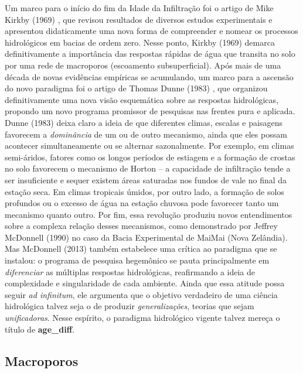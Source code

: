 \documentclass[./main.tex]{subfiles}
\begin{document}
\par Um marco para o início do fim da Idade da Infiltração foi o artigo de Mike Kirkby (1969) \cite{Kirkby1969}, que revisou resultados de diversos estudos experimentais e apresentou didaticamente uma nova forma de compreender e nomear os processos hidrológicos em bacias de ordem zero. Nesse ponto, Kirkby (1969) demarca definitivamente a importância das respostas rápidas de água que transita no solo por uma rede de macroporos (escoamento subsuperficial). Após mais de uma década de novas evidências empíricas se acumulando, um marco para a ascensão do novo \gls{paradigma} foi o artigo de Thomas Dunne (1983) \cite{Dunne1983}, que organizou definitivamente uma nova visão esquemática sobre as respostas hidrológicas, propondo um novo programa promissor de pesquisas nas frentes pura e aplicada. Dunne (1983) deixa claro a ideia de que diferentes climas, escalas e paisagens favorecem a \textit{dominância} de um ou de outro mecanismo, ainda que eles possam acontecer simultaneamente ou se alternar sazonalmente. Por exemplo, em climas semi-áridos, fatores como os longos períodos de estiagem e a formação de crostas no solo favorecem o mecanismo de Horton -- a capacidade de infiltração tende a ser insuficiente e sequer existem áreas saturadas nos fundos de vale no final da estação seca. Em climas tropicais úmidos, por outro lado, a formação de solos profundos ou o excesso de água na estação chuvosa pode favorecer tanto um mecanismo quanto outro. Por fim, essa revolução produziu novos entendimentos sobre a complexa relação desses mecanismos, como demonstrado por Jeffrey McDonnell (1990) \cite{mcdonnell1990} no caso da Bacia Experimental de MaiMai (Nova Zelândia). Mas McDonnell (2013) \cite{Mcdonnell2013} também estabelece uma crítica ao \gls{paradigma} que se instalou: o programa de pesquisa hegemônico se pauta principalmente em \textit{diferenciar} as múltiplas respostas hidrológicas, reafirmando a ideia de complexidade e singularidade de cada ambiente. Ainda que essa atitude possa seguir \textit{ad infinitum}, ele argumenta que o objetivo verdadeiro de uma ciência hidrológica talvez seja o de produzir \textit{generalizações}, teorias que sejam \textit{unificadoras}. Nesse espírito, o \gls{paradigma} hidrológico vigente talvez mereça o título de \textbf{\gls{age_diff}}.

\subsection{Macroporos}
\end{document}
